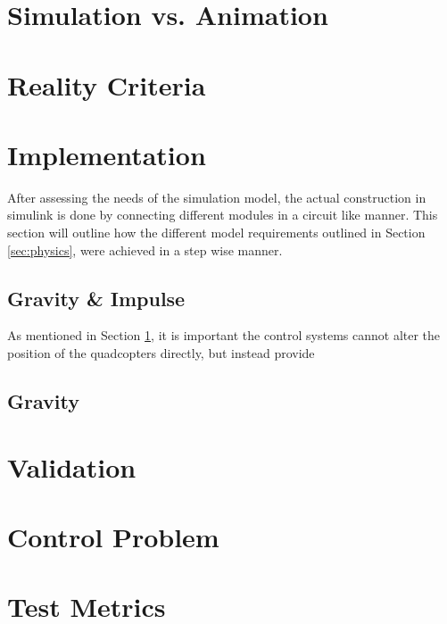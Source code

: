 \section{Simulation vs. Animation}
\label{sec:simulation_animation}


\section{Reality Criteria}
\label{sec:reality}


\section{Implementation}
\label{sec:construction}

After assessing the needs of the simulation model, the actual construction in simulink is done by connecting different modules in a circuit like manner. This section will outline how the different model requirements outlined in Section \ref{sec:physics}, were achieved in a step wise manner. 



\subsection{Gravity \& Impulse}
As mentioned in Section \ref{sec:simulation_animation}, it is important the control systems cannot alter the position of the quadcopters directly, but instead provide 

\subsection{Gravity}


\section{Validation}
\label{sec:validation}

\section{Control Problem}
\label{sec:control_problem}

\section{Test Metrics}
\label{sec:test_metrics}


